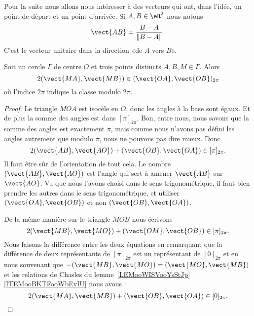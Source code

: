Pour la suite nous allons nous intéresser à des vecteurs qui ont, dans l'idée, un point de départ et un point d'arrivée. Si \( A,B\in \eR^2\) nous notons
\begin{equation}
	\vect{ AB }=\frac{ B-A }{ \| B-A \| }.
\end{equation}
C'est le vecteur unitaire dans la direction «de \( A\) vers \( B\)».

\begin{theorem}       \label{THOooQDNKooTlVmmj}
	Soit un cercle \( \Gamma\) de centre \( O\) et trois points distincts \( A,B,M\in \Gamma\). Alors
	\begin{equation}
		2(\vect{ MA },\vect{ MB })\in (\vect{ OA },\vect{ OB })_{2\pi}
	\end{equation}
	où l'indice \( 2\pi\) indique la classe modulo \( 2\pi\).
\end{theorem}

\begin{proof}
	Le triangle \( MOA\) est isocèle en \( O\), donc les angles à la base sont égaux.
	Et de plus la somme des angles est dans \( [\pi]_{2\pi}\). Bon, entre nous, nous savons que la somme des angles est exactement \( \pi\), mais comme nous n'avons pas défini les angles autrement que modulo \( \pi\), nous ne pouvons pas dire mieux. Donc
	\begin{equation}
		2(\vect{ AB },\vect{ AO })+(\vect{ OB },\vect{ OA })\in [\pi]_{2\pi}.
	\end{equation}
	Il faut être sûr de l'orientation de tout cela. Le nombre \( (\vect{ AB },\vect{ AO })\) est l'angle qui sert à amener \( \vect{ AB }\) sur \( \vect{ AO }\). Vu que nous l'avons choisi dans le sens trigonométrique, il faut bien prendre les autres dans le sens trigonométrique, et utiliser \( (\vect{ OA }, \vect{ OB })\) et non \( (\vect{ OB },\vect{ OA })\).

	\begin{center}
		
	\end{center}

	De la même manière sur le triangle \( MOB\) nous écrivons
	\begin{equation}
		2(\vect{ MB },\vect{ MO })+(\vect{ OM },\vect{ OB })\in[\pi]_{2\pi}.
	\end{equation}
	Nous faisons la différence entre les deux équations en remarquant que la différence de deux représentants de \( [\pi]_{2\pi}\) est un représentant de \( [0]_{2\pi}\) et en nous souvenant que \( -(\vect{ MB },\vect{ MO })=(\vect{ MO },\vect{ MB })\) et les relations de Chasles du lemme~\ref{LEMooWISVooYsStJp}\ref{ITEMooBKTFooWbEvIU} nous avons :
	\begin{equation}
		2(\vect{ MA },\vect{ MB })+(\vect{ OB },\vect{ OA })\in[0]_{2\pi}.
	\end{equation}
\end{proof}

